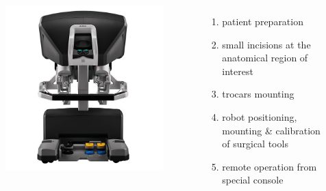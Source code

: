 \begin{frame}
\begin{columns}
\begin{center}
\begin{figure}[htbp]
\includegraphics[width=\textwidth]{../images/intuitive-davinci-console-front-lowres.jpg}\\
\end{figure}
\end{center}
\begin{enumerate}
\item patient preparation
\item small incisions at the anatomical region of interest
\item trocars mounting
\item robot positioning, mounting \& calibration of surgical tools
\item remote operation from special console
\end{enumerate}
\end{columns}
\end{frame}

